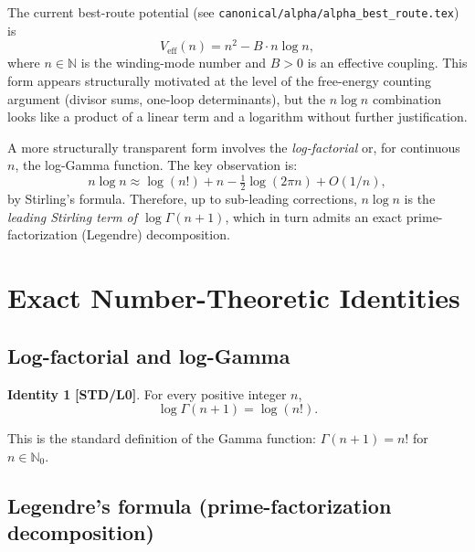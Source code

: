 \documentclass[12pt,a4paper]{article}
\theoremstyle{definition}
\theoremstyle{remark}
\newcommand{\NN}{\mathbb{N}}
\newcommand{\Veff}{V_{\mathrm{eff}}}
\newcommand{\STDLZ}{\textcolor{gray!70!black}{\textbf{[STD/L0]}}}
\begin{document}
The current best-route potential (see \texttt{canonical/alpha/alpha\_best\_route.tex}) is
\begin{equation}
  \Veff(n) = n^2 - B \cdot n\log n,
  \label{eq:veff_standard}
\end{equation}
where $n \in \NN$ is the winding-mode number and $B > 0$ is an effective coupling.
This form appears structurally motivated at the level of the free-energy counting
argument (divisor sums, one-loop determinants), but the $n\log n$ combination
looks like a product of a linear term and a logarithm without further justification.

A more structurally transparent form involves the \emph{log-factorial} or, for
continuous $n$, the log-Gamma function.  The key observation is:
\begin{equation}
  n\log n \approx \log(n!) + n - \tfrac{1}{2}\log(2\pi n) + O(1/n),
\end{equation}
by Stirling's formula.  Therefore, up to sub-leading corrections, $n\log n$ is
the \emph{leading Stirling term of $\log\Gamma(n+1)$}, which in turn admits
an exact prime-factorization (Legendre) decomposition.

\section{Exact Number-Theoretic Identities}
\label{sec:identities}

\subsection{Log-factorial and log-Gamma}
\label{sec:logfac}

\begin{resultbox}
\textbf{Identity 1} \STDLZ{}.  For every positive integer $n$,
\begin{equation}
  \log\Gamma(n+1) = \log(n!).
  \label{eq:logGamma_factorial}
\end{equation}
\end{resultbox}

This is the standard definition of the Gamma function: $\Gamma(n+1) = n!$
for $n \in \NN_0$.

\subsection{Legendre's formula (prime-factorization decomposition)}
\label{sec:legendre}
\end{document}
